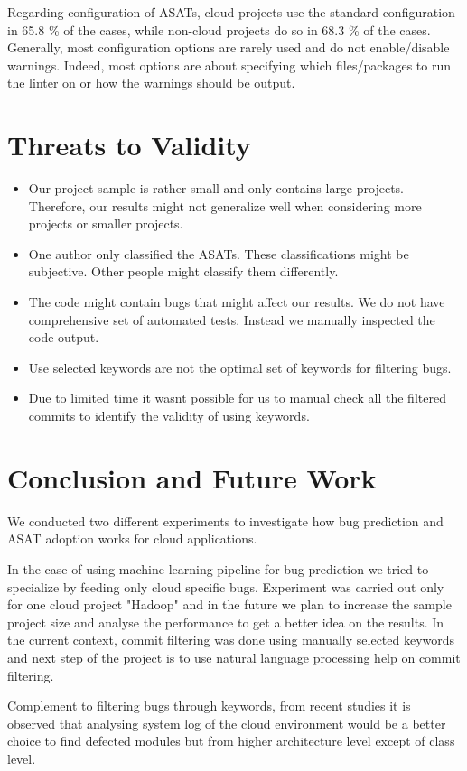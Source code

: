 \documentclass{seal_article}
\begin{document}
Regarding configuration of ASATs, cloud projects use the standard configuration in 65.8 \% of the cases, while non-cloud projects do so in 68.3 \% of the cases. Generally, most configuration options are rarely used and do not enable/disable warnings. Indeed, most options are about specifying which files/packages to run the linter on or how the warnings should be output.


\section{Threats to Validity}
\begin{itemize}
    \item Our project sample is rather small and only contains large projects. Therefore, our results might not generalize well when considering more projects or smaller projects.
    \item One author only classified the ASATs. These classifications might be subjective. Other people might classify them differently.
    \item The code might contain bugs that might affect our results. We do not have comprehensive set of automated tests. Instead we manually inspected the code output.
    \item Use selected keywords are not the optimal set of keywords for filtering bugs. 
    \item Due to limited time it wasnt possible for us to manual check all the filtered commits to identify the validity of using keywords.
\end{itemize}

\section{Conclusion and Future Work}
We conducted two different experiments to investigate how bug prediction and ASAT adoption works for cloud applications.

In the case of using machine learning pipeline for bug prediction we tried to specialize by feeding only cloud specific bugs. Experiment was carried out only for one cloud project "Hadoop" and in the future we plan to increase the sample project size and analyse the performance to get a better idea on the results. 
In the current context, commit filtering was done using manually selected keywords and next step of the project is to use natural language processing help on commit filtering. 

Complement to filtering bugs through keywords, from recent studies it is observed that analysing system log of the cloud environment would be a better choice to find defected modules but from higher architecture level except of class level.
\end{document}
